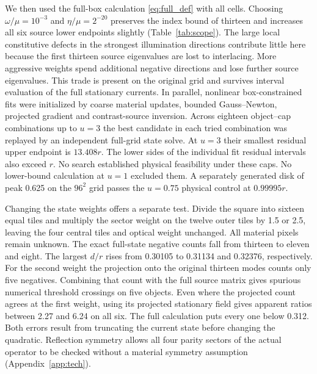 We then used the full-box calculation \eqref{eq:full_def} with all cells. Choosing $\omega/\mu=10^{-3}$ and $\eta/\mu=2^{-20}$ preserves the index bound of thirteen and increases all six source lower endpoints slightly (Table~\ref{tab:scope}). The large local constitutive defects in the strongest illumination directions contribute little here because the first thirteen source eigenvalues are lost to interlacing. More aggressive weights spend additional negative directions and lose further source eigenvalues. This trade is present on the original grid and survives interval evaluation of the full stationary currents. In parallel, nonlinear box-constrained fits were initialized by coarse material updates, bounded Gauss--Newton, projected gradient and contrast-source inversion. Across eighteen object--cap combinations up to $u=3$ the best candidate in each tried combination was replayed by an independent full-grid state solve. At $u=3$ their smallest residual upper endpoint is $13.408r$. The lower sides of the individual fit residual intervals also exceed $r$. No search established physical feasibility under these caps. No lower-bound calculation at $u=1$ excluded them. A separately generated disk of peak 0.625 on the $96^2$ grid passes the $u=0.75$ physical control at $0.99995r$.

Changing the state weights offers a separate test. Divide the square into sixteen equal tiles and multiply the sector weight on the twelve outer tiles by 1.5 or 2.5, leaving the four central tiles and optical weight unchanged. All material pixels remain unknown. The exact full-state negative counts fall from thirteen to eleven and eight. The largest $d/r$ rises from 0.30105 to 0.31134 and 0.32376, respectively. For the second weight the projection onto the original thirteen modes counts only five negatives. Combining that count with the full source matrix gives spurious numerical threshold crossings on five objects. Even where the projected count agrees at the first weight, using its projected stationary field gives apparent ratios between 2.27 and 6.24 on all six. The full calculation puts every one below 0.312. Both errors result from truncating the current state before changing the quadratic. Reflection symmetry allows all four parity sectors of the actual operator to be checked without a material symmetry assumption (Appendix~\ref{app:tech}).

